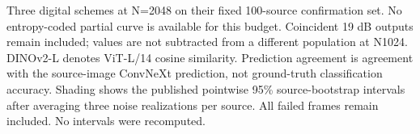 Three digital schemes at N=2048 on their fixed 100-source confirmation set. No entropy-coded partial curve is available for this budget. Coincident 19 dB outputs remain included; values are not subtracted from a different population at N1024. DINOv2-L denotes ViT-L/14 cosine similarity. Prediction agreement is agreement with the source-image ConvNeXt prediction, not ground-truth classification accuracy. Shading shows the published pointwise 95\% source-bootstrap intervals after averaging three noise realizations per source. All failed frames remain included. No intervals were recomputed.
